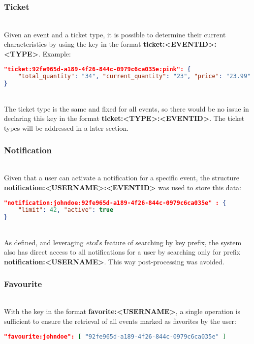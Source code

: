 \documentclass[screen,review]{acmart}
\begin{document}
\subsubsection{Ticket}~\\
Given an event and a ticket type, it is possible to determine their current characteristics by using the key in the format \textbf{ticket:<EVENTID>:<TYPE>}. Example:

\begin{lstlisting}[language=json]
"ticket:92fe965d-a189-4f26-844c-0979c6ca035e:pink": {
    "total_quantity": "34", "current_quantity": "23", "price": "23.99"
}
\end{lstlisting}\\

The ticket type is the same and fixed for all events, so there would be no issue in declaring this key in the format \textbf{ticket:<TYPE>:<EVENTID>}. The ticket types will be addressed in a later section. \\

\subsubsection{Notification}~\\
Given that a user can activate a notification for a specific event, the structure \textbf{notification:<USERNAME>:<EVENTID>} was used to store this data:

\begin{lstlisting}[language=json]
"notification:johndoe:92fe965d-a189-4f26-844c-0979c6ca035e" : {
    "limit": 42, "active": true
}
\end{lstlisting}\\

As defined, and leveraging \textit{etcd}'s feature of searching by key prefix, the system also has direct access to all notifications for a user by searching only for prefix \textbf{notification:<USERNAME>}. This way post-processing was avoided. \\

\subsubsection{Favourite}~\\
With the key in the format \textbf{favorite:<USERNAME>}, a single operation is sufficient to ensure the retrieval of all events marked as favorites by the user:

\begin{lstlisting}[language=json]
"favourite:johndoe": [ "92fe965d-a189-4f26-844c-0979c6ca035e" ]
\end{lstlisting}\\
\end{document}
